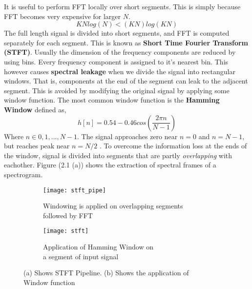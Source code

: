 It is useful to perform FFT locally over short segments. This is simply because FFT becomes very expensive for larger $N$. 
\[
KNlog(N) < (KN)log(KN)
\]
The full length signal is divided into short segments, and FFT is computed separately for each segment. This is known as \textbf{Short Time Fourier Transform (STFT)}. Usually the dimension of the frequency components are reduced by using bins. Every frequency component is assigned to it's nearest bin. This however causes \textbf{spectral leakage} when we divide the signal into rectangular windows. That is, components at the end of the segment can leak to the adjacent segment. This is avoided by modifying the original signal by applying some window function. The most common window function is the \textbf{Hamming Window} defined as,
\begin{equation}
h[n] = 0.54 - 0.46cos(\frac{2 \pi n}{N-1})
\end{equation}
Where $n \in {0,1,...,N-1}$. The signal approaches zero near $n=0$ and $n=N-1$, but reaches peak near $n=N/2$ \cite{specLeak}. To overcome the information loss at the ends of the window, signal is divided into segments that are partly \textit{overlapping} with eachother. Figure (2.1 (a)) shows the extraction of spectral frames of a spectrogram.  
\begin{figure}[h]
       \begin{subfigure}[b]{0.6\textwidth}
        \texttt{[image: stft\_pipe]}
        \caption{Windowing is applied on overlapping segments\\ followed by FFT }
        \label{fig:STFT Pipe}
       \end{subfigure}
	    \begin{subfigure}[b]{0.4\textwidth}
        \texttt{[image: stft]}
        \caption{
        Application of Hamming Window on \\a segment of input signal
        }
        \label{fig:Hamming Window}
       \end{subfigure}
       \caption{(a) Shows STFT Pipeline. (b) Shows the application of \\Window function}\label{fig:STFT}
\end{figure}
\bigskip

